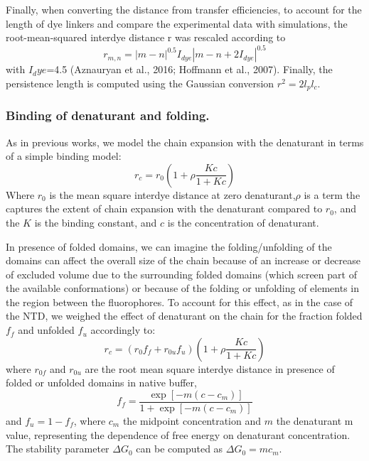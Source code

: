 \documentclass[../main.tex]{subfiles}
\begin{document}
        Finally, when converting the distance from transfer efficiencies, to account for the length of dye linkers and compare the experimental data with simulations, the root-mean-squared interdye distance r was rescaled according to
        \begin{equation}\label{appendix-e-eq17}
            r_{m,n}=|m-n|^{0.5}I_{dye}|m-n+2I_{dye}|^{0.5}
        \end{equation}
        with $I_dye$=4.5 (Aznauryan et al., 2016; Hoffmann et al., 2007). Finally, the persistence length is computed using the Gaussian conversion $r^2= 2l_{p}l_{c}$\cite{Rubinstein2003-fa}.

    \subsubsection{Binding of denaturant and folding.}
        As in previous works\cite{Muller-Spath2010-oy,Soranno2012-jn,Soranno2017-bi}, we model the chain expansion with the denaturant in terms of a simple binding model:
        \begin{equation}\label{appendix-e-eq18}
            r_c = r_0(1+\rho\frac{Kc}{1+Kc})
        \end{equation}
        Where $r_0$ is the mean square interdye distance at zero denaturant,$\rho$ is a term the captures the extent of chain expansion with the denaturant compared to $r_0$, and the $K$ is the binding constant, and $c$ is the concentration of denaturant. 

        In presence of folded domains, we can imagine the folding/unfolding of the domains can affect the overall size of the chain because of an increase or decrease of excluded volume due to the surrounding folded domains (which screen part of the available conformations) or because of the folding or unfolding of elements in the region between the fluorophores. To account for this effect, as in the case of the NTD, we weighed the effect of denaturant on the chain for the fraction folded $f_f$ and unfolded $f_u$ accordingly to:
        \begin{equation}\label{appendix-e-eq19}
            r_c = (r_0f_f+r_{0u}f_u)(1+\rho\frac{Kc}{1+Kc})
        \end{equation}
        where $r_{0f}$ and $r_{0u}$ are the root mean square interdye distance in presence of folded or unfolded domains in native buffer,
        \begin{equation}\label{appendix-e-eq20}
            f_f = \frac{\exp[-m(c-c_m)]}{1+\exp[-m(c-c_m)]}
        \end{equation}
        and $f_u =1-f_{f}$, where $c_m$ the midpoint concentration and $m$ the denaturant m value, representing the dependence of free energy on denaturant concentration. The stability parameter $\Delta G_0$ can be computed as $\Delta G_0=mc_m$.
\end{document}
